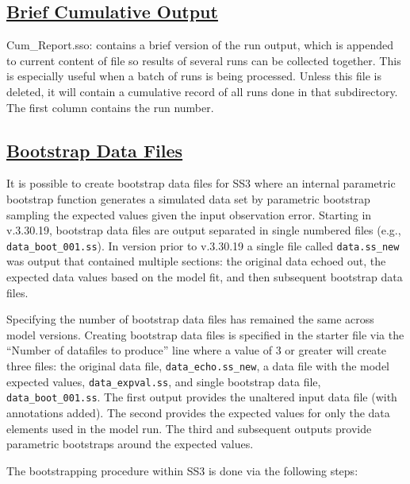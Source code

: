 \hypertarget{CumulativeOutput}{}
\subsection[Brief Cumulative Output]{\protect\hyperlink{CumulativeOutput}{Brief Cumulative Output}}
Cum\_Report.sso: contains a brief version of the run output, which is appended to current content of file so results of several runs can be collected together. This is especially useful when a batch of runs is being processed. Unless this file is deleted, it will contain a cumulative record of all runs done in that subdirectory. The first column contains the run number.  

\hypertarget{bootstrap}{}
\subsection[Bootstrap Data Files]{\protect\hyperlink{bootstrap}{Bootstrap Data Files}}
It is possible to create bootstrap data files for SS3 where an internal parametric bootstrap function generates a simulated data set by parametric bootstrap sampling the expected values given the input observation error. Starting in v.3.30.19, bootstrap data files are output separated in single numbered files (e.g., \texttt{data\_boot\_001.ss}). In version prior to v.3.30.19 a single file called \texttt{data.ss\_new} was output that contained multiple sections: the original data echoed out, the expected data values based on the model fit, and then subsequent bootstrap data files. 

Specifying the number of bootstrap data files has remained the same across model versions. Creating bootstrap data files is specified in the starter file via the ``Number of datafiles to produce'' line where a value of 3 or greater will create three files: the original data file, \texttt{data\_echo.ss\_new}, a data file with the model expected values, \texttt{data\_expval.ss}, and single bootstrap data file, \texttt{data\_boot\_001.ss}. The first output provides the unaltered input data file (with annotations added). The second provides the expected values for only the data elements used in the model run. The third and subsequent outputs provide parametric bootstraps around the expected values. 

The bootstrapping procedure within SS3 is done via the following steps:

